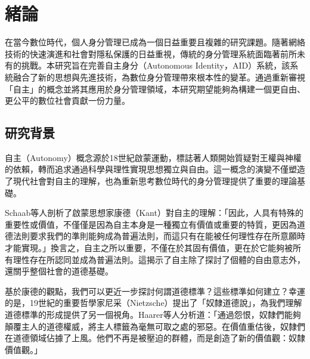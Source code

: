 
\chapter{緒論}
在當今數位時代，個人身分管理已成為一個日益重要且複雜的研究課題。隨著網絡技術的快速演進和社會對隱私保護的日益重視，傳統的身分管理系統面臨著前所未有的挑戰。本研究旨在完善自主身分（Autonomous Identity，AID）系統，該系統融合了新的思想與先進技術，為數位身分管理帶來根本性的變革。通過重新審視「自主」的概念並將其應用於身分管理領域，本研究期望能夠為構建一個更自由、更公平的數位社會貢獻一份力量。
\section{研究背景}
自主（Autonomy）概念源於18世紀啟蒙運動，標誌著人類開始質疑對王權與神權的依賴，轉而追求通過科學與理性實現思想獨立與自由。這一概念的演變不僅塑造了現代社會對自主的理解，也為重新思考數位時代的身分管理提供了重要的理論基礎。

Schaab等人\cite{Schaab2022}剖析了啟蒙思想家康德（Kant）對自主的理解：「因此，人具有特殊的重要性或價值，不僅僅是因為自主本身是一種獨立有價值或重要的特質，更因為道德法則要求我們的準則能夠成為普遍法則，而這只有在能被任何理性存在所意願時才能實現。」換言之，自主之所以重要，不僅在於其固有價值，更在於它能夠被所有理性存在所認同並成為普遍法則。這揭示了自主除了探討了個體的自由意志外，還關乎整個社會的道德基礎。

基於康德的觀點，我們可以更近一步探討何謂道德標準？這些標準如何建立？幸運的是，19世紀的重要哲學家尼采（Nietzsche）提出了「奴隸道德說」，為我們理解道德標準的形成提供了另一個視角。Haarer等人\cite{haarer2020nietzsche}分析道：「通過怨恨，奴隸們能夠顛覆主人的道德權威，將主人標籤為毫無可取之處的邪惡。在價值重估後，奴隸們在道德領域佔據了上風。他們不再是被壓迫的群體，而是創造了新的價值觀：奴隸價值觀。」

